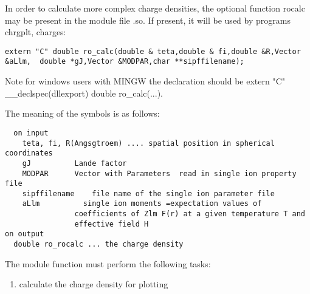 In order to calculate more complex charge densities, the optional function
{\prg rocalc} may be present in the module file {\prg *.so}. If present,
it will be used by programs {\prg chrgplt},
{\prg charges}:

\begin{verbatim}
extern "C" double ro_calc(double & teta,double & fi,double &R,Vector &aLlm,  double *gJ,Vector &MODPAR,char **sipffilename);
\end{verbatim}

Note for windows users with MINGW the declaration should be {\prg extern "C" \_\_declspec(dllexport) double %
ro\_calc(...)}.

The meaning of the symbols is as follows:
{\footnotesize
\begin{verbatim}
  on input
    teta, fi, R(Angsgtroem) .... spatial position in spherical coordinates
    gJ          Lande factor
    MODPAR      Vector with Parameters  read in single ion property file
    sipffilename    file name of the single ion parameter file
    aLlm          single ion moments =expectation values of
                coefficients of Zlm F(r) at a given temperature T and
                effective field H
on output
  double ro_rocalc ... the charge density
\end{verbatim}
}

The module function must perform the following tasks:
\begin{enumerate}
\item calculate the charge density for plotting
\end{enumerate}


